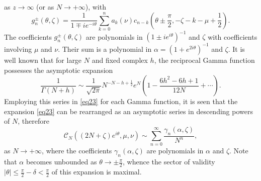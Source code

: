 \documentclass[a4paper,twoside,10pt]{amsart}
\numberwithin{equation}{section}
\begin{document}
as $z\to \infty$ (or as $N \to +\infty$), with
\[
g_n^ \pm  \left( {\theta,\zeta} \right) = \frac{1}{{1 \mp ie^{ - i\theta } }}\sum\limits_{k = 0}^n {a_k \left( \nu  \right)c_{n - k} \left( {\theta  \pm \frac{\pi }{2},-\zeta - k - \mu  + \frac{1}{2}} \right)}. 
\]
The coefficients $g_n^ \pm  \left( {\theta,\zeta} \right)$ are polynomials in $\left( {1 \pm ie^{i\theta } } \right)^{ - 1}$ and $\zeta$ with coefficients involving $\mu$ and $\nu$. Their sum is a polynomial in $\alpha=\left( {1 + e^{2i\theta } } \right)^{ - 1}$ and $\zeta$. It is well known that for large $N$ and fixed complex $h$, the reciprocal Gamma function possesses the asymptotic expansion
\[
\frac{1}{{\Gamma \left( {N + h} \right)}} \sim \frac{1}{{\sqrt {2\pi } }}N^{ - N - h + \frac{1}{2}} e^N \left( {1 - \frac{{6h^2  - 6h + 1}}{{12N}} +  \cdots } \right) .
\]
Employing this series in \eqref{eq23} for each Gamma function, it is seen that the expansion \eqref{eq23} can be rearranged as an asymptotic series in descending powers of $N$, therefore
\begin{equation}\label{eq24}
\mathscr{C}_N \left( {\left( {2N + \zeta } \right)e^{i\theta } ,\mu ,\nu } \right) \sim \sum\limits_{n = 0}^\infty  {\frac{{\gamma _n \left( {\alpha, \zeta} \right)}}{{N^n }}} ,
\end{equation}
as $N \to +\infty$, where the coefficients $\gamma _n \left( {\alpha, \zeta} \right)$ are polynomials in $\alpha$ and $\zeta$. Note that $\alpha$ becomes unbounded as $\theta \to \pm \frac{\pi}{2}$, whence the sector of validity $\left|\theta\right|\leq \frac{\pi}{2}-\delta<\frac{\pi}{2}$ of this expansion is maximal.
\end{document}
